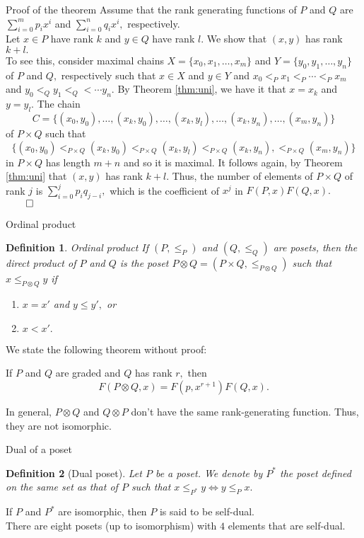 \documentclass[handout, aspectratio=169]{beamer}
\newtheorem{defn}{Definition}
\begin{document}
\begin{frame}{Proof of the theorem}
	Assume that the rank generating functions of $P$ and $Q$ are $\sum_{i=0}^{m}p_ix^i$ and $\sum_{i=0}^{n}q_ix^i,$ respectively.\\
	Let $x \in P$ have rank $k$ and $y \in Q$ have rank $l.$ We show that $(x, y)$ has rank $k + l.$\\
	To see this, consider maximal chains $X = \{x_0, x_1,\ldots, x_m\}$ and $Y = \{y_0, y_1, \ldots, y_n\}$ of $P$ and $Q,$ respectively such that $x \in X$ and $y \in Y$ and $x_0 <_P x_1 <_P \cdots <_P x_m$ and $y_0 <_Q y_1 <_Q < \cdots y_n.$ By Theorem \ref{thm:uni}, we have it that $x = x_k$ and $y = y_l.$ The chain 
	\[C = \{(x_0, y_0), \ldots, (x_k, y_0), \ldots, (x_k, y_l), \ldots, (x_k, y_n), \ldots, (x_m, y_n)\}\]
	of $P \times Q$ such that
	\[\{(x_0, y_0) <_{P \times Q} (x_k, y_0) <_{P \times Q} (x_k, y_l) <_{P \times Q} (x_k, y_n), <_{P \times Q} (x_m, y_n)\}\]
	in $P \times Q$ has length $m + n$ and so it is maximal. It follows again, by Theorem \ref{thm:uni} that $(x, y)$ has rank $k + l.$ Thus, the number of elements of $P \times Q$ of rank $j$ is $\displaystyle\sum_{i=0}^{j}p_iq_{j-i},$ which is the coefficient of $x^j$ in $F(P, x)F(Q, x).$ \hfill $\qed$
\end{frame}
\begin{frame}{Ordinal product}
	\begin{defn}{Ordinal product}
		If $(P, \le_P)$ and $(Q, \le_Q)$ are posets, then the direct product of $P$ and $Q$ is the poset $P \otimes Q = (P \times Q, \le_{P \otimes Q})$ such that $x \le_{P \otimes Q} y$ if
		\begin{enumerate} 
			\item $x = x'$ and $y \le y',$ or
			\item $x < x'.$
		\end{enumerate}
	\end{defn}
	We state the following theorem without proof:
	\begin{theorem}
		If $P$ and $Q$ are graded and $Q$ has rank $r,$ then
		\[F(P \otimes Q, x) = F(p, x^{r+1})F(Q, x).\]
	\end{theorem}
	In general, $P \otimes Q$ and $Q \otimes P$ don't have the same rank-generating function. Thus, they are not isomorphic.
\end{frame}
\begin{frame}{Dual of a poset}
	\begin{defn}[Dual poset]
		Let $P$ be a poset. We denote by $P^*$ the poset defined on the same set as that of $P$ such that $x \le_{P^*} y \iff y \le_P x.$
	\end{defn}
	If $P$ and $P^*$ are isomorphic, then $P$ is said to be self-dual.\\
	There are eight posets (up to isomorphism) with $4$ elements that are self-dual.
\end{frame}
\end{document}
